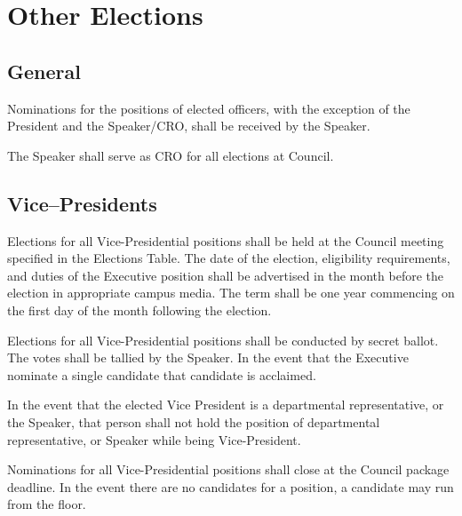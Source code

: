 \newpage

\section{Other Elections}
\subsection{General}
\begin{longenum}[ label*=\thesubsection.\arabic*., align=left]
	\item Nominations for the positions of elected officers, with the exception of the President and the Speaker/CRO, shall be received by the Speaker. 
 	\item The Speaker shall serve as CRO for all elections at Council.
\end{longenum}

\subsection{Vice--Presidents}
\begin{longenum}[ label*=\thesubsection.\arabic*., align=left]
	\item Elections for all Vice-Presidential positions shall be held at the Council meeting specified in the Elections Table. The date of the election, eligibility requirements, and duties of the Executive position shall be advertised in the month before the election in appropriate campus media. The term shall be one year commencing on the first day of the month following the election. 
	\item Elections for all Vice-Presidential positions shall be conducted by secret ballot. The votes shall be tallied by the Speaker. In the event that the Executive nominate a single candidate that candidate is acclaimed.
	\item In the event that the elected Vice President is a departmental representative, or the Speaker, that person shall not hold the position of departmental representative, or Speaker while being Vice-President. 
	\item Nominations for all Vice-Presidential positions shall close at the Council package deadline. In the event there are no candidates for a position, a candidate may run from the floor.
\end{longenum}

